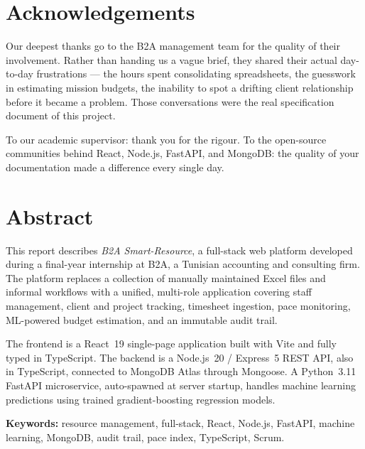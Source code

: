 \documentclass[12pt,a4paper]{report}
\begin{document}
\chapter*{Acknowledgements}\thispagestyle{plain}
Our deepest thanks go to the B2A management team for the quality of their involvement.
Rather than handing us a vague brief, they shared their actual day-to-day frustrations ---
the hours spent consolidating spreadsheets, the guesswork in estimating mission budgets,
the inability to spot a drifting client relationship before it became a problem.
Those conversations were the real specification document of this project.

To our academic supervisor: thank you for the rigour.
To the open-source communities behind React, Node.js, FastAPI, and MongoDB:
the quality of your documentation made a difference every single day.

\chapter*{Abstract}\thispagestyle{plain}
This report describes \textit{B2A Smart-Resource}, a full-stack web platform developed
during a final-year internship at B2A, a Tunisian accounting and consulting firm.
The platform replaces a collection of manually maintained Excel files and informal
workflows with a unified, multi-role application covering staff management, client
and project tracking, timesheet ingestion, pace monitoring, ML-powered budget estimation,
and an immutable audit trail.

The frontend is a React~19 single-page application built with Vite and fully typed
in TypeScript. The backend is a Node.js~20 / Express~5 REST API, also in TypeScript,
connected to MongoDB Atlas through Mongoose. A Python~3.11 FastAPI microservice,
auto-spawned at server startup, handles machine learning predictions using trained
gradient-boosting regression models.

\textbf{Keywords:} resource management, full-stack, React, Node.js, FastAPI, machine
learning, MongoDB, audit trail, pace index, TypeScript, Scrum.

\tableofcontents{}
\listoftables{}
\end{document}
